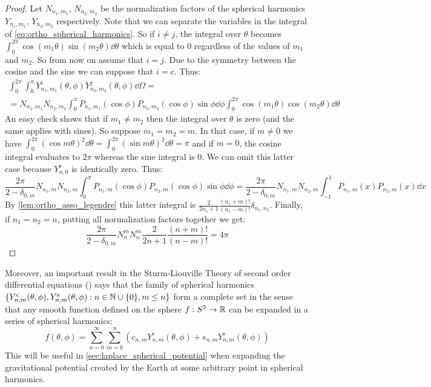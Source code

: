 \documentclass[../main.tex]{subfiles}
\begin{document}
\begin{proof}
  Let $N_{n_1,m_1}$, $N_{n_2,m_2}$ be the normalization factors of the spherical harmonics $Y_{n_1,m_1}$, $Y_{n_2,m_2}$ respectively. Note that we can separate the variables in the integral of \cref{eq:ortho_spherical_harmonics}. So if $i\ne j$, the integral over $\theta$ becomes $\int_0^{2\pi}\cos(m_1\theta)\sin(m_2\theta)\dd{\theta}$ which is equal to 0 regardless of the values of $m_1$ and $m_2$. So from now on assume that $i=j$. Due to the symmetry between the cosine and the sine we can suppose that $i=\mathrm{c}$. Thus:
  \begin{multline}
    \int_0^{2\pi}\int_0^\pi Y_{n_1,m_1}^i(\theta,\phi) Y_{n_2,m_2}^j(\theta,\phi)\dd\Omega=\\= N_{n_1,m_1}N_{n_2,m_2}\int_0^\pi P_{n_1,m_1}(\cos\phi) P_{n_2,m_2}(\cos\phi)\sin\phi\dd\phi\int_{0}^{2\pi}\cos(m_1\theta)\cos(m_2\theta)\dd{\theta}
  \end{multline}
  An easy check shows that if $m_1\neq m_2$ then the integral over $\theta$ is zero (and the same applies with sines). So suppose $m_1=m_2=m$. In that case, if $m\ne 0$ we have $\int_{0}^{2\pi}{(\cos m\theta)}^2\dd{\theta}=\int_{0}^{2\pi}{(\sin m\theta)}^2\dd{\theta}=\pi$ and if $m=0$, the cosine integral evaluates to $2\pi$ whereas the sine integral is 0. We can omit this latter case because $Y_{n,0}^{\mathrm{s}}$ is identically zero. Thus:
  \begin{equation}
    \frac{2\pi}{2-\delta_{0,m}} N_{n_1,m}N_{n_2,m}\int_0^\pi P_{n_1,m}(\cos\phi) P_{n_2,m}(\cos\phi)\sin\phi\dd\phi=\frac{2\pi}{2-\delta_{0,m}} N_{n_1,m}N_{n_2,m}\int_{-1}^1 P_{n_1,m}(x) P_{n_2,m}(x)\dd{x}
  \end{equation}
  By \cref{lem:ortho_asso_legendre} this latter integral is $\frac{2}{2n_1+1}\frac{(n_1+m)!}{(n_1-m)!} \delta_{n_1,n_2}$. Finally, if $n_1=n_2=n$, putting all normalization factors together we get:
  \begin{equation}
    \frac{2\pi}{2-\delta_{0,m}} N_{n}^{m}N_{n}^{m}\frac{2}{2n+1}\frac{(n+m)!}{(n-m)!}=4\pi
  \end{equation}
\end{proof}
Moreover, an important result in the Sturm-Liouville Theory of second order differential equations (\cite{wiki:sturmliouville,completenessSL}) says that the family of spherical harmonics $\{Y_{n,m}^{\mathrm{c}}(\theta,\phi),Y_{n,m}^{\mathrm{s}}(\theta,\phi):n\in\mathbb{N}\cup\{0\},m\leq n\}$ form a complete set in the sense that any smooth function defined on the sphere $f:S^2\rightarrow\mathbb{R}$ can be expanded in a series of spherical harmonics:
\begin{equation}
  f(\theta,\phi)=\sum_{n=0}^\infty\sum_{m=0}^n (c_{n,m} Y_{n,m}^{\mathrm{c}}(\theta,\phi)+s_{n,m} Y_{n,m}^{\mathrm{s}}(\theta,\phi))
\end{equation}
This will be useful in \cref{sec:laplace_spherical_potential} when expanding the gravitational potential created by the Earth at some arbitrary point in spherical harmonics.
\end{document}
